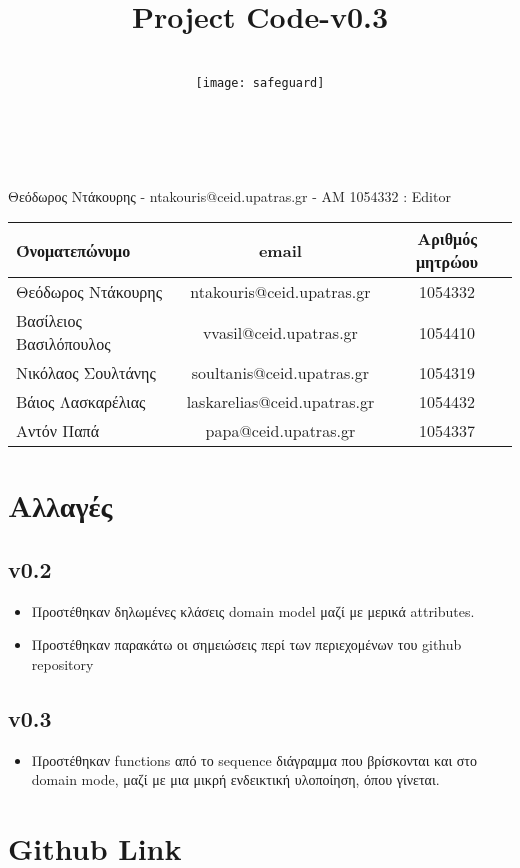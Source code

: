 \documentclass{article}
\title{Project Code-v0.3}
\author{\\
\texttt{[image: safeguard]}\\[1ex]\\\\
}
\begin{document}
\maketitle

\newpage


Θεόδωρος Ντάκουρης - ntakouris@ceid.upatras.gr - ΑΜ 1054332 : Editor
\\

\begin{tabular}{|l|c|c|}
\hline
Όνοματεπώνυμο & email & Αριθμός μητρώου  \\
\hline
Θεόδωρος Ντάκουρης & ntakouris@ceid.upatras.gr & 1054332 \\
Βασίλειος Βασιλόπουλος & vvasil@ceid.upatras.gr &  1054410 \\
Νικόλαος Σουλτάνης & soultanis@ceid.upatras.gr & 1054319  \\
Βάιος Λασκαρέλιας & laskarelias@ceid.upatras.gr & 1054432 \\
Αντόν Παπά & papa@ceid.upatras.gr & 1054337 \\
\hline
\end{tabular}

\renewcommand{\contentsname}{Περιεχόμενα}
\tableofcontents

\section{Αλλαγές}
\subsection{v0.2}
\begin{itemize}
    \item Προστέθηκαν δηλωμένες κλάσεις domain model μαζί με μερικά attributes.
    \item Προστέθηκαν παρακάτω οι σημειώσεις περί των περιεχομένων του github repository
\end{itemize}

\subsection{v0.3}
\begin{itemize}
    \item Προστέθηκαν functions από το sequence διάγραμμα που βρίσκονται και στο domain mode, μαζί με μια μικρή ενδεικτική υλοποίηση, όπου γίνεται.
\end{itemize}

\section{Github Link}
\end{document}
